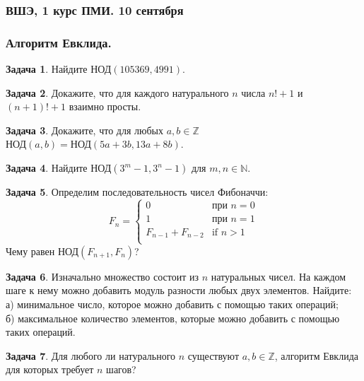 \documentclass[12pt, fleqn]{extarticle}
\newcommand{\nat}{\mathbb{N}}
\newcommand{\integer}{\mathbb{Z}}
\theoremstyle{definition}
\newtheorem{problem}{Задача}
\theoremstyle{remark}
\begin{document}
\clearpage
\thispagestyle{empty}
\subsubsection*{ВШЭ, 1 курс ПМИ. 10 сентября}

\subsubsection*{Алгоритм Евклида.}

\begin{problem}
Найдите $\text{НОД}(105369,4991)$.
\end{problem}

\begin{problem}
Докажите, что для каждого натурального $n$
числа $n! + 1$ и $(n + 1)! + 1$ взаимно просты.
\end{problem}

\begin{problem}
Докажите, что для любых $a, b \in \integer$ 
$\text{НОД}(a,b) = \text{НОД}(5a + 3b,13a + 8b)$.
\end{problem}


\begin{problem}
Найдите $\text{НОД}(3^{m} - 1, 3^{n} - 1)$
для $m, n \in \nat$.
\end{problem}

\begin{problem}
Определим последовательность чисел Фибоначчи:
$$
F_{n} =
\begin{cases}
0 & \text{при } n = 0 \\
1 & \text{при } n = 1\\
F_{n - 1} + F_{n - 2} & \text{if } n > 1\\
\end{cases}
$$
Чему равен $\text{НОД}(F_{n + 1}, F_{n})$?
\end{problem}

\begin{problem}
Изначально множество состоит из $n$ натуральных чисел.
На каждом шаге к нему можно добавить модуль разности любых двух элементов. 
Найдите:\\
а) минимальное число, которое можно добавить с помощью таких операций;\\
б) максимальное количество элементов, которые можно добавить с помощью таких операций.
\end{problem}

\begin{problem}
Для любого ли натурального $n$
существуют $a, b \in \integer$,
алгоритм Евклида для которых требует $n$ шагов?
\end{problem}
\end{document}
